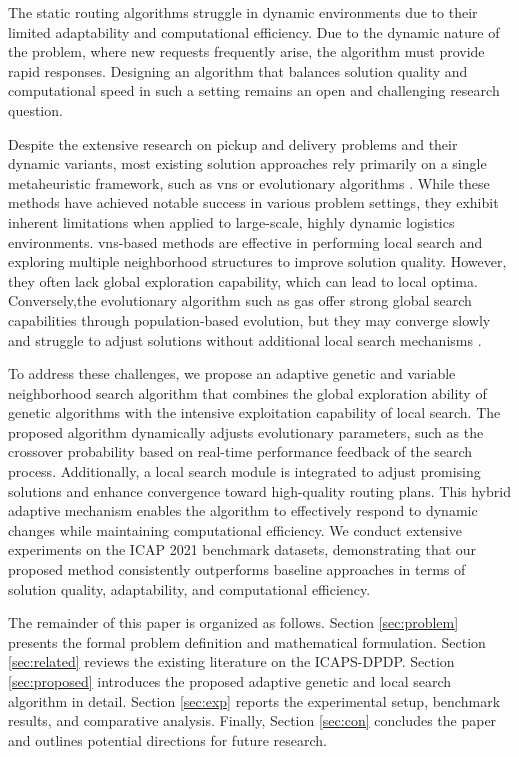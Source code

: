 \documentclass[]{interact}
\begin{document}
The static routing algorithms struggle in dynamic environments due to their limited adaptability and computational efficiency. Due to the dynamic nature of the problem, where new requests frequently arise, the algorithm must provide rapid responses. Designing an algorithm that balances solution quality and computational speed in such a setting remains an open and challenging research question.

Despite the extensive research on pickup and delivery problems and their dynamic variants, most existing solution approaches rely primarily on a single metaheuristic framework, such as \gls{vns} or evolutionary algorithms \cite{horvath2025recent, voigt2025review}. While these methods have achieved notable success in various problem settings, they exhibit inherent limitations when applied to large-scale, highly dynamic logistics environments. \gls{vns}-based methods are effective in performing local search and exploring multiple neighborhood structures to improve solution quality. However, they often lack global exploration capability, which can lead to local optima. Conversely,the evolutionary algorithm such as \gls{gas} offer strong global search capabilities through population-based evolution, but they may converge slowly and struggle to adjust solutions without additional local search mechanisms \cite{cai2024decomposition, wang2024hybrid}.

To address these challenges, we propose an adaptive genetic and variable neighborhood search algorithm that combines the global exploration ability of genetic algorithms with the intensive exploitation capability of local search. The proposed algorithm dynamically adjusts evolutionary parameters, such as the crossover probability based on real-time performance feedback of the search process. Additionally, a local search module is integrated to adjust promising solutions and enhance convergence toward high-quality routing plans. This hybrid adaptive mechanism enables the algorithm to effectively respond to dynamic changes while maintaining computational efficiency. We conduct extensive experiments on the ICAP 2021 benchmark datasets, demonstrating that our proposed method consistently outperforms baseline approaches in terms of solution quality, adaptability, and computational efficiency.


The remainder of this paper is organized as follows. Section \ref{sec:problem} presents the formal problem definition and mathematical formulation. Section \ref{sec:related} reviews the existing literature on the ICAPS-DPDP.
Section \ref{sec:proposed} introduces the proposed adaptive genetic and local search algorithm in detail. Section \ref{sec:exp} reports the experimental setup, benchmark results, and comparative analysis. Finally, Section \ref{sec:con} concludes the paper and outlines potential directions for future research.
\end{document}
